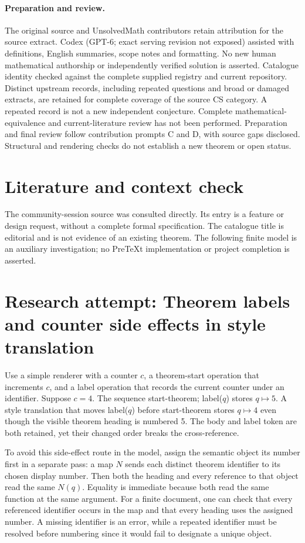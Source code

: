 \documentclass[11pt]{article}
\begin{document}
\paragraph{Preparation and review.}
The original source and UnsolvedMath contributors retain attribution for the source extract. Codex (GPT-6; exact serving revision not exposed) assisted with definitions, English summaries, scope notes and formatting. No new human mathematical authorship or independently verified solution is asserted. Catalogue identity checked against the complete supplied registry and current repository. Distinct upstream records, including repeated questions and broad or damaged extracts, are retained for complete coverage of the source CS category. A repeated record is not a new independent conjecture. Complete mathematical-equivalence and current-literature review has not been performed. Preparation and final review follow contribution prompts C and D, with source gaps disclosed. Structural and rendering checks do not establish a new theorem or open status.
\label{end:statement}

\section{Literature and context check}
The community-session source was consulted directly. Its entry is a feature or design request, without a complete formal specification. The catalogue title is editorial and is not evidence of an existing theorem. The following finite model is an auxiliary investigation; no PreTeXt implementation or project completion is asserted.
\section{Research attempt: Theorem labels and counter side effects in style translation}
Use a simple renderer with a counter $c$, a theorem-start operation that increments $c$, and a label operation that records the current counter under an identifier. Suppose $c=4$. The sequence start-theorem; label($q$) stores $q\mapsto5$. A style translation that moves label($q$) before start-theorem stores $q\mapsto4$ even though the visible theorem heading is numbered 5. The body and label token are both retained, yet their changed order breaks the cross-reference.

To avoid this side-effect route in the model, assign the semantic object its number first in a separate pass: a map $N$ sends each distinct theorem identifier to its chosen display number. Then both the heading and every reference to that object read the same $N(q)$. Equality is immediate because both read the same function at the same argument. For a finite document, one can check that every referenced identifier occurs in the map and that every heading uses the assigned number. A missing identifier is an error, while a repeated identifier must be resolved before numbering since it would fail to designate a unique object.
\end{document}
